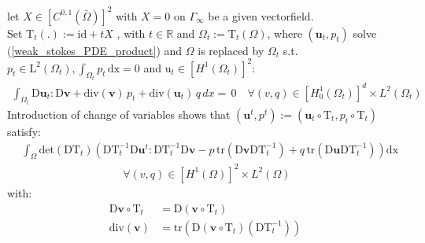 \begin{theorem}
let $X \in [C^{0,1}(\bar{\Omega})]^2$ with $X = 0$ on $\Gamma_{\infty}$ be a given vectorfield. \\
Set $\mathrm{T}_t(.) := \mathrm{id} + tX $ , with $t \in \mathbb{R}$ and $\Omega_t := \mathrm{T}_t(\Omega)$, where 
$(\mathbf{u}_t, p_t)$ solve (\ref{weak_stokes_PDE_product}) and $\Omega$ is replaced by $\Omega_t$ s.t. \\
$p_t \in \mathrm{L}^2(\Omega_t), \int_{\Omega_t} p_t \, \mathrm{dx} = 0 $ and $\mathrm{u}_t \in [H^1(\Omega_t)]^2:$ 
\begin{align}
	\int_{\Omega_t} \mathrm{D} \mathbf{u}_t : \mathrm{D} \mathbf{\mathbf{v}} + \mathrm{div}(\mathbf{v}) \, p_t + \mathrm{div}(\mathbf{u}_t) \, q \, dx = \, 0 \quad \forall (v,q)
    \in  [H^1_0(\Omega_t)]^d \times L^2(\Omega_t)
\end{align}
Introduction of change of variables shows that $(\mathbf{u}^t, p^t) := (\mathbf{u}_t \circ \mathrm{T}_t, p_t \circ \mathrm{T}_t)$ satisfy:
\begin{equation}
\begin{aligned}\label{trafo_weak_stokes}
	&\int_\Omega \mathrm{det}(\mathrm{DT}_t)
	\left( \mathrm{DT}_t^{-1} \mathrm{D}\mathbf{u}^t:\mathrm{DT}_t^{-1} \mathrm{D}\mathbf{v} -p\, \mathrm{tr}(\mathrm{D}\mathbf{v}\mathrm{DT}_t^{-1})  +
	q \, \mathrm{tr}(\mathrm{D}\mathbf{u}\mathrm{DT}_t^{-1}) \right) \mathrm{dx} \\
	& \quad \quad \quad \quad \quad \quad \quad \quad \quad \ \forall (v,q) \in [H^1(\Omega)]^2 \times L^2(\Omega)
\end{aligned}
\end{equation}
with:
\begin{align*}
	\mathrm{D}\mathbf{v}\circ\mathrm{T}_t &= \mathrm{D}(\mathbf{v}\circ\mathrm{T}_t) \\
	\mathrm{div}(\mathbf{v}) &= \mathrm{tr} \left( \mathrm{D}(\mathbf{v} \circ \mathrm{T}_t)(\mathrm{DT}_t^{-1}) \right)
\end{align*}

\vfill

\pagebreak


\end{theorem}
